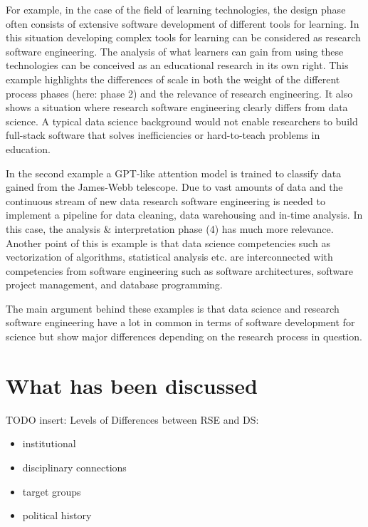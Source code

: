 \documentclass[
        english,biblatex
    ]{lni}
\providecommand{\tightlist}{%
    \setlength{\itemsep}{0pt}\setlength{\parskip}{0pt}}
\begin{document}
    For example, in the case of the field of learning technologies, the
    design phase often consists of extensive software development of
    different tools for learning. In this situation developing complex
    tools for learning can be considered as research software
    engineering. The analysis of what learners can gain from using these
    technologies can be conceived as an educational research in its own
    right. This example highlights the differences of scale in both the
    weight of the different process phases (here: phase 2) and the
    relevance of research engineering. It also shows a situation where
    research software engineering clearly differs from data science. A
    typical data science background would not enable researchers to
    build full-stack software that solves inefficiencies or
    hard-to-teach problems in education.

    In the second example a GPT-like attention model is trained to
    classify data gained from the James-Webb telescope. Due to vast
    amounts of data and the continuous stream of new data research
    software engineering is needed to implement a pipeline for data
    cleaning, data warehousing and in-time analysis. In this case, the
    analysis \& interpretation phase (4) has much more relevance.
    Another point of this is example is that data science competencies
    such as vectorization of algorithms, statistical analysis etc. are
    interconnected with competencies from software engineering such as
    software architectures, software project management, and database
    programming.

    The main argument behind these examples is that data science and
    research software engineering have a lot in common in terms of
    software development for science but show major differences
    depending on the research process in question.

    \section{What has been discussed}\label{what-has-been-discussed}

    TODO insert: Levels of Differences between RSE and DS:

    \begin{itemize}
    \tightlist
    \item
      institutional
    \item
      disciplinary connections
    \item
      target groups
    \item
      political history
    \end{itemize}
\end{document}
